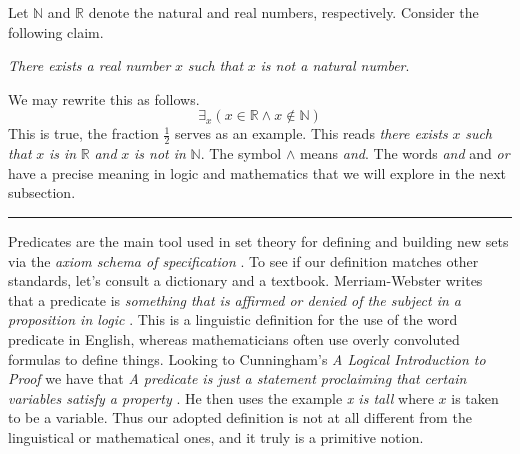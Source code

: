             \begin{example}
                Let $\mathbb{N}$ and $\mathbb{R}$ denote the natural and real
                numbers, respectively. Consider the following claim.
                \begin{center}
                    \textit{There exists a real number} $x$
                    \textit{such that} $x$ \textit{is not a natural number}.
                \end{center}
                We may rewrite this as follows.
                \begin{equation}
                    \exists_{x}(x\in\mathbb{R}\land{x}\notin\mathbb{N})
                \end{equation}
                This is true, the fraction $\frac{1}{2}$ serves as an example.
                This reads \textit{there exists} $x$ \textit{such that}
                $x$ \textit{is in} $\mathbb{R}$ \textit{and} $x$
                \textit{is not in} $\mathbb{N}$. The symbol $\land$ means
                \textit{and}. The words \textit{and} and \textit{or} have a
                precise meaning in logic and mathematics that we will explore
                in the next subsection.
            \end{example}
            \hrule\par\hfill\par
            Predicates are the main tool used in set theory for defining and
            building new sets via the \textit{axiom schema of specification}%
            . To see if our definition
            matches other standards, let's consult a dictionary and a textbook.
            Merriam-Webster writes that a predicate is
            \textit{something that is affirmed or denied of the subject in a}
            \textit{proposition in logic} \cite{MerriamWebsterPredicateDef}.
            This is a linguistic definition for the use of the word predicate
            in English, whereas mathematicians often use overly convoluted
            formulas to define things. Looking to Cunningham's
            \textit{A Logical Introduction to Proof} we have that
            \textit{A predicate is just a statement proclaiming that}
            \textit{certain variables satisfy a property}
            \cite{Cunningham2010}. He then uses the example \textit{x is tall}
            where $x$ is taken to be a variable. Thus our adopted definition is
            not at all different from the linguistical or mathematical ones,
            and it truly is a primitive notion.
